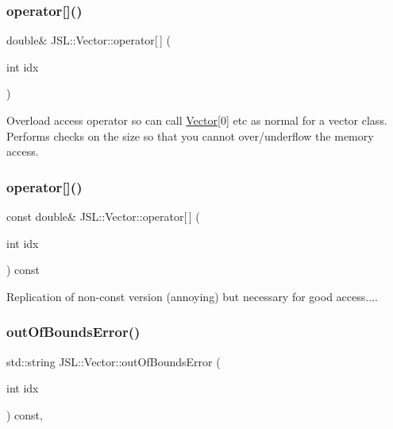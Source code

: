 \subsubsection{\texorpdfstring{operator[]()}{operator[]()}\hspace{0.1cm}{\footnotesize\ttfamily [1/2]}}
{\footnotesize\ttfamily double\& J\+S\+L\+::\+Vector\+::operator\mbox{[}$\,$\mbox{]} (\begin{DoxyParamCaption}\item[{int}]{idx }\end{DoxyParamCaption})\hspace{0.3cm}{\ttfamily [inline]}}



Overload access operator so can call \hyperlink{classJSL_1_1Vector}{Vector}\mbox{[}0\mbox{]} etc as normal for a vector class. Performs checks on the size so that you cannot over/underflow the memory access. 

\mbox{\label{classJSL_1_1Vector_ae461792ef0aeb62ac07c939dacedda99}} 
\subsubsection{\texorpdfstring{operator[]()}{operator[]()}\hspace{0.1cm}{\footnotesize\ttfamily [2/2]}}
{\footnotesize\ttfamily const double\& J\+S\+L\+::\+Vector\+::operator\mbox{[}$\,$\mbox{]} (\begin{DoxyParamCaption}\item[{int}]{idx }\end{DoxyParamCaption}) const\hspace{0.3cm}{\ttfamily [inline]}}



Replication of non-\/const version (annoying) but necessary for good access.... 

\mbox{\label{classJSL_1_1Vector_ab081a68e1fc526f4bf866de0ba61a09b}} 
\subsubsection{\texorpdfstring{out\+Of\+Bounds\+Error()}{outOfBoundsError()}}
{\footnotesize\ttfamily std\+::string J\+S\+L\+::\+Vector\+::out\+Of\+Bounds\+Error (\begin{DoxyParamCaption}\item[{int}]{idx }\end{DoxyParamCaption}) const\hspace{0.3cm}{\ttfamily [inline]}, {\ttfamily [protected]}}


